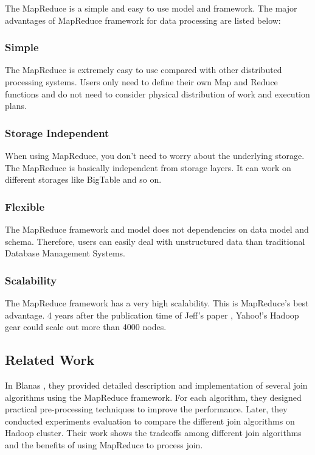 \documentclass[sigconf, nonacm]{acmart}
\begin{document}
The MapReduce is a simple and easy to use model and framework. The major advantages of MapReduce framework for data processing are listed below:

\subsubsection{\textbf{Simple}} 

The MapReduce is extremely easy to use compared with other distributed processing systems. Users only need to define their own Map and Reduce functions and do not need to consider physical distribution of work and execution plans.

\subsubsection{\textbf{Storage Independent}}

When using MapReduce, you don't need to worry about the underlying storage. The MapReduce is basically independent from storage layers. It can work on different storages like BigTable \cite{27898} and so on.

\subsubsection{\textbf{Flexible}} 

The MapReduce framework and model does not dependencies on data model and schema. Therefore, users can easily deal with unstructured data than traditional Database Management Systems.

\subsubsection{\textbf{Scalability}}

The MapReduce framework has a very high scalability. This is MapReduce's best advantage. 4 years after the publication time of Jeff's paper \cite{62}, Yahoo!'s Hadoop gear could scale out more than 4000 nodes.


\subsection{Related Work}
In Blanas \cite{blanas2010comparison}, they provided detailed description and implementation of several join algorithms using the MapReduce framework. For each algorithm, they designed practical pre-processing techniques to improve the performance. Later, they conducted experiments evaluation to compare the different join algorithms on Hadoop cluster. Their work shows the tradeoffs among different join algorithms and the benefits of using MapReduce to process join.
\end{document}
